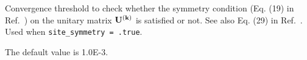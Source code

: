 Convergence threshold to check whether the symmetry condition (Eq. (19) in Ref.~\cite{sakuma-prb13})
on the unitary matrix $\mathbf{U}^{(\mathbf{k})}$ is satisfied or not.
See also Eq. (29) in Ref.~\cite{sakuma-prb13}.
Used when \verb#site_symmetry = .true#.

The default value is 1.0E-3.

%
%
%
%
%
%
%
%
%
%

